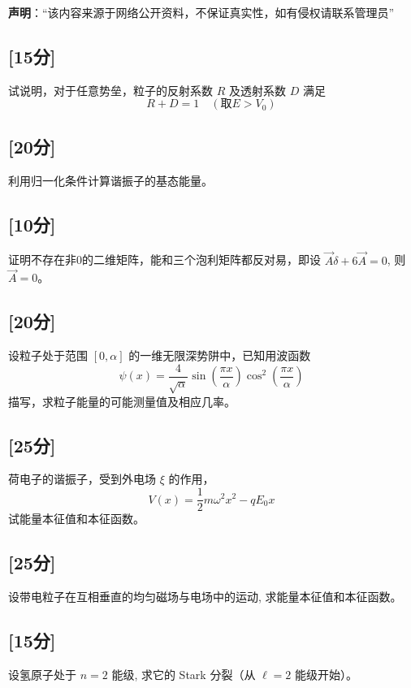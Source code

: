 
\textbf{声明}：“该内容来源于网络公开资料，不保证真实性，如有侵权请联系管理员”

\subsection{[15分]}
试说明，对于任意势垒，粒子的反射系数 $R$ 及透射系数 $D$ 满足
\[    R + D = 1 \quad (\text{取} E > V_0) ~ \]
\subsection{[20分]}
利用归一化条件计算谐振子的基态能量。
\subsection{[10分]}
证明不存在非0的二维矩阵，能和三个泡利矩阵都反对易，即设 $\vec A \delta + 6\vec A = 0$, 则 $\vec{A} = 0$。
\subsection{[20分]}
设粒子处于范围 $[0, \alpha]$ 的一维无限深势阱中，已知用波函数
    \[    \psi(x) = \frac{4}{\sqrt{\alpha}} \sin\left(\frac{\pi x}{\alpha}\right) \cos^2\left(\frac{\pi x}{\alpha}\right) ~ \]
    描写，求粒子能量的可能测量值及相应几率。
\subsection{[25分]}
荷电子的谐振子，受到外电场 $\xi$ 的作用，
    \[    V(x) = \frac{1}{2} m \omega^2 x^2 - q E_0 x  ~\]
 试能量本征值和本征函数。
\subsection{[25分]}
设带电粒子在互相垂直的均匀磁场与电场中的运动, 求能量本征值和本征函数。
\subsection{[15分]}
设氢原子处于 $n=2$ 能级, 求它的 Stark 分裂（从 $\ell=2$ 能级开始）。
